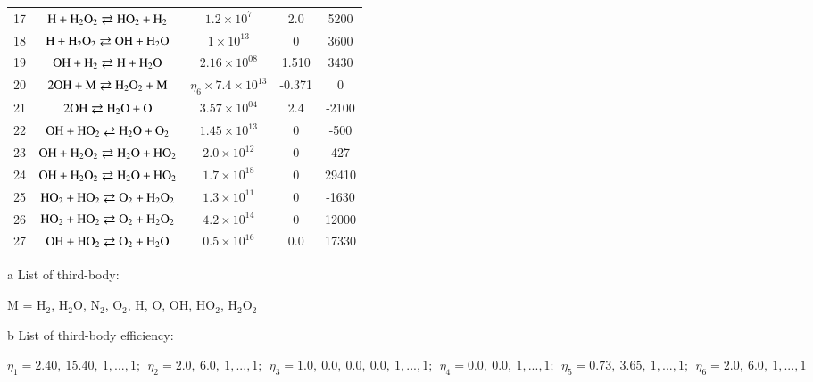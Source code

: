 \documentclass{warpdoc}
\begin{document}
\begin{table}[t]
\begin{center}
\begin{threeparttable}
\begin{tabular}{ccccc}
    17 & $\rm H + H_2O_2 \rightleftarrows  HO_2 + H_2$  & $ 1.2 \times 10^{7} $& 2.0 & 5200 \\
    18 & $\rm H + H_2O_2 \rightleftarrows  OH + H_2O$  & $ 1 \times 10^{13} $& 0 & 3600 \\
    19 & $\rm OH + H_2 \rightleftarrows  H + H_2O$  & $ 2.16 \times 10^{08} $& 1.510 & 3430 \\
    20 & $\rm 2OH + M \rightleftarrows  H_2O_2 + M$  & $ \eta_6 \times 7.4 \times 10^{13} $& -0.371 & 0 \\
    21 & $\rm 2OH \rightleftarrows  H_2O + O$  & $ 3.57 \times 10^{04} $& 2.4 & -2100 \\
    22 & $\rm OH + HO_2 \rightleftarrows  H_2O + O_2$  & $ 1.45 \times 10^{13} $& 0 & -500 \\
    23 & $\rm OH + H_2O_2 \rightleftarrows  H_2O + HO_2$  & $ 2.0 \times 10^{12} $& 0 & 427 \\
    24 & $\rm OH + H_2O_2 \rightleftarrows  H_2O + HO_2$  & $ 1.7 \times 10^{18} $& 0 & 29410  \\
    25 & $\rm HO_2 + HO_2 \rightleftarrows  O_2 + H_2O_2$  & $ 1.3 \times 10^{11} $& 0 & -1630  \\
    26 & $\rm HO_2 + HO_2 \rightleftarrows  O_2 + H_2O_2$  & $ 4.2 \times 10^{14} $& 0 & 12000  \\
    27 & $\rm OH + HO_2 \rightleftarrows  O_2 + H_2O$  & $ 0.5 \times 10^{16} $& 0.0 & 17330  \\
\bottomrule
\end{tabular}
\label{tab:GRI-Mech-Reaction}
\begin{tablenotes}
\item[{a}] List of third-body: 
\item M = H$_2$, H$_2$O, N$_2$, O$_2$, H, O, OH, HO$_2$, H$_2$O$_2$
\item[{b}] List of third-body efficiency: 
\item $\eta_1 = 2.40,~ 15.40,~1,...,1;~~  \eta_2 = 2.0,~ 6.0,~1,...,1;~~ \eta_3 = 1.0,~ 0.0,~ 0.0,~ 0.0,~1,...,1;~~ \eta_4 = 0.0,~ 0.0,~1,...,1;~~ \eta_5 = 0.73,~ 3.65,~1,...,1;~~ \eta_6 = 2.0,~ 6.0,~1,...,1$
\end{tablenotes}
\end{threeparttable}
\end{center}
\end{table}
%




~
\newpage
~
\newpage
~
\newpage
~
\newpage





\end{document}
